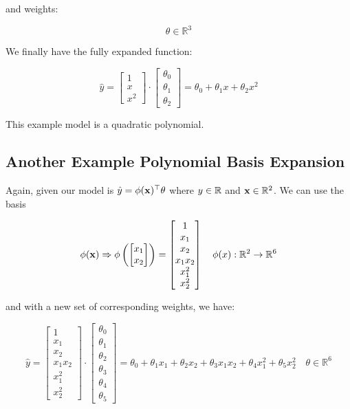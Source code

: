 and weights:

\begin{equation}
    \theta \in \mathbb{R}^3
\end{equation}

We finally have the fully expanded function:

\begin{equation}
    \hat{y} = \begin{bmatrix} 1 \\ x \\ x^2 \end{bmatrix} \cdot \begin{bmatrix} \theta_0 \\ \theta_1 \\ \theta_2 \end{bmatrix} = \theta_0 + \theta_1 x + \theta_2 x^2
\end{equation}

This example model is a quadratic polynomial. 

\subsection{Another Example Polynomial Basis Expansion}
Again, given our model is $\hat{y} = \phi(\mathbf{x})^\top \theta$ where $y \in \mathbb{R} $ and $\mathbf{x} \in \mathbb{R}^2$. We can use the basis

\begin{equation} 
    \phi(\mathbf{x}) \Rightarrow \phi\left(\begin{bmatrix} x_1 \\ x_2 \end{bmatrix}\right) = \begin{bmatrix} 1 \\ x_1 \\ x_2 \\ x_1x_2 \\ x_1^2 \\ x_2^2 \end{bmatrix} \quad \phi(x) : \mathbb{R}^2 \rightarrow \mathbb{R}^6
\end{equation}

and with a new set of corresponding weights, we have:

\begin{equation}
    \hat{y} = \begin{bmatrix} 1 \\ x_1 \\ x_2 \\ x_1x_2 \\ x_1^2 \\ x_2^2 \end{bmatrix} \cdot  \begin{bmatrix} \theta_0 \\ \theta_1 \\ \theta_2 \\ \theta_3 \\ \theta_4 \\ \theta_5 \end{bmatrix} = \theta_0 + \theta_1 x_1 + \theta_2 x_2 + \theta_3 x_1x_2 + \theta_4 x_1^2 + \theta_5 x_2^2 \quad \theta \in \mathbb{R}^6
\end{equation}


